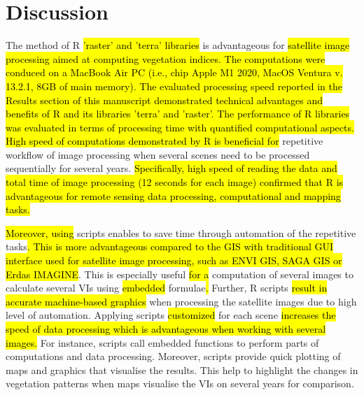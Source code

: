 \documentclass[jimaging,article,submit,pdftex,moreauthors]{Definitions/mdpi}
\begin{document}
\section{Discussion}

The method of R \hl{'raster' and 'terra' libraries} is advantageous for \hl{satellite image processing aimed at computing vegetation indices. The computations were conduced on a MacBook Air PC (i.e., chip Apple M1 2020, MacOS Ventura v. 13.2.1, 8GB of main memory). The evaluated processing speed reported in the Results section of this manuscript demonstrated technical advantages and benefits of R and its libraries 'terra' and 'raster'. The performance of R libraries was evaluated in terms of processing time with quantified computational aspects. High speed of computations demonstrated by R is beneficial for }repetitive workflow of image processing when several scenes need to be processed sequentially for several years. \hl{Specifically, high speed of reading the data and total time of image processing (12 seconds for each image) confirmed that R is advantageous for remote sensing data processing, computational and mapping tasks.}

\hl{Moreover, using} scripts\hl{ }enables to save time through automation of the repetitive tasks\hl{. This is more advantageous compared to the GIS with traditional GUI interface used for satellite image processing, such as ENVI GIS, SAGA GIS or Erdas IMAGINE}. This is especially useful \hl{for a} computation of several\hl{ }images to calculate several VIs using \hl{embedded }formulae\hl{. }Further, R scripts \hl{result in accurate machine-based graphics} when processing the satellite images due to high level of automation. Applying scripts \hl{customized} for each scene \hl{increases the speed of data processing which is advantageous when working with several images.} For instance, scripts call embedded functions to perform parts of computations and data processing. Moreover, scripts provide quick plotting of maps and graphics that visualise the results. This help to highlight the changes in vegetation patterns when maps visualise the VIs on several years for comparison. 
\end{document}
